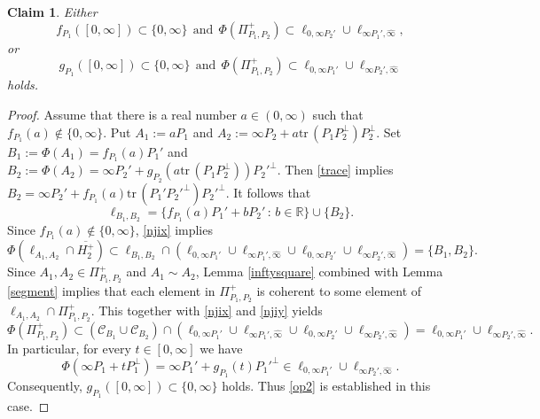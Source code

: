 \documentclass[10pt]{amsart}
\newtheorem{claim}[theorem]{Claim}
\theoremstyle{definition}
\theoremstyle{remark}
\numberwithin{subsection}{section}
\numberwithin{equation}{section}
\newcommand\cC{{\mathcal{C}}}
\newcommand\oHp{{\overline{H_2^+}}}
\newcommand\oi{{\widehat{\infty}}}
\newcommand\ppp{{\Pi_{P_1,P_2}^+}}
\begin{document}
\begin{claim}\label{twolines}
Either 
\begin{equation}\label{op1}
f_{P_1}([0, \infty])\subset \{0, \infty\} \ \ \text{and} \ \ \Phi(\ppp)\subset\ell_{0, \infty P_2'}\cup\ell_{\infty P_1', \oi},
\end{equation}
 or 
\begin{equation}\label{op2}
g_{P_1}([0, \infty])\subset \{0, \infty\} \ \ \text{and} \ \ \Phi(\ppp)\subset\ell_{0, \infty P_1'}\cup\ell_{\infty P_2', \oi}
\end{equation}
holds.
\end{claim}
\begin{proof}
Assume that there is a real number $a\in (0, \infty)$ such that $f_{P_1}(a)\notin \{0, \infty\}$. 
Put $A_1:=aP_1$ and $A_2:=\infty P_2 + a\mathrm{tr}\,(P_1P_2^\perp) P_2^\perp$.
Set $B_1:=\Phi(A_1)=f_{P_1}(a)P_1'$ and $B_2:=\Phi(A_2) = \infty P_2' + g_{P_2}(a\mathrm{tr}\,(P_1P_2^\perp)){P_2'}^\perp$. 
Then \eqref{trace} implies $B_2= \infty P_2' +  f_{P_1}(a)\mathrm{tr}\,(P_1'{P_2'}^\perp){P_2'}^\perp$.
It follows that 
\[
\ell_{B_1, B_2} = \{f_{P_1}(a) P_1' + bP_2'\,:\, b\in \mathbb{R}\}\cup \{B_2\}.
\]
Since $f_{P_1}(a)\notin \{0, \infty\}$, \eqref{njix} implies  
\begin{equation}\label{njiy}
\Phi(\ell_{A_1, A_2}\cap \oHp)\subset\ell_{B_1, B_2}\cap (\ell_{0, \infty P_1'}\cup\ell_{\infty P_1', \oi}\cup\ell_{0, \infty P_2'}\cup\ell_{\infty P_2', \oi}) = \{B_1, B_2\}.
\end{equation}
Since $A_1, A_2 \in \ppp$ and $A_1\sim A_2$,
Lemma \ref{inftysquare} combined with Lemma \ref{segment} implies that each element in $\ppp$ is coherent to some element of $\ell_{A_1, A_2}\cap \ppp$. 
This together with \eqref{njix} and \eqref{njiy} yields
\[
\Phi(\ppp) \subset (\cC_{B_1}\cup \cC_{B_2})\cap (\ell_{0, \infty P_1'}\cup\ell_{\infty P_1', \oi}\cup\ell_{0, \infty P_2'}\cup\ell_{\infty P_2', \oi}) =\ell_{0, \infty P_1'}\cup\ell_{\infty P_2', \oi}. 
\]
In particular, for every $t \in [0, \infty]$ we have 
\[
\Phi ( \infty P_1 + tP_{1}^\perp) = \infty P_1' +g_{P_1} (t) {P_1'}^\perp \in \ell_{0, \infty P_1'}\cup\ell_{\infty P_2', \oi}.
\]
Consequently, $g_{P_1}([0, \infty])\subset \{0, \infty\}$ holds.
Thus \eqref{op2} is established in this case.


\end{proof}
\end{document}
